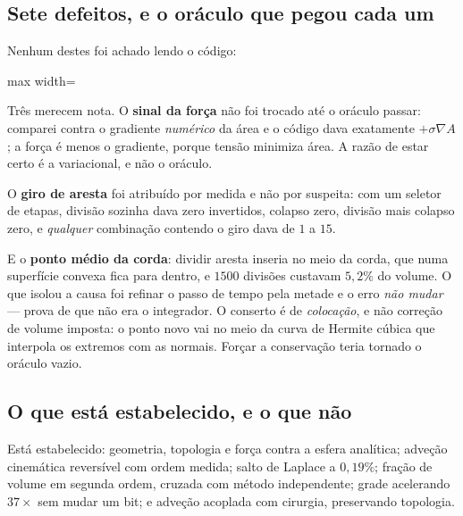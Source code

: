 \subsection{Sete defeitos, e o or\'aculo que pegou cada um}

Nenhum destes foi achado lendo o c\'odigo:

\begin{adjustbox}{max width=\linewidth}
\end{adjustbox}

Tr\^es merecem nota. O \textbf{sinal da for\c{c}a} n\~ao foi trocado at\'e o
or\'aculo passar: comparei contra o gradiente \emph{num\'erico} da \'area e o
c\'odigo dava exatamente $+\sigma\nabla A$; a for\c{c}a \'e menos o gradiente,
porque tens\~ao minimiza \'area. A raz\~ao de estar certo \'e a variacional, e
n\~ao o or\'aculo.

O \textbf{giro de aresta} foi atribu\'ido por medida e n\~ao por suspeita: com um
seletor de etapas, divis\~ao sozinha dava zero invertidos, colapso zero,
divis\~ao mais colapso zero, e \emph{qualquer} combina\c{c}\~ao contendo o giro
dava de $1$ a $15$.

E o \textbf{ponto m\'edio da corda}: dividir aresta inseria no meio da corda, que
numa superf\'icie convexa fica para dentro, e $1500$ divis\~oes custavam
$5{,}2\%$ do volume. O que isolou a causa foi refinar o passo de tempo pela
metade e o erro \emph{n\~ao mudar} --- prova de que n\~ao era o integrador. O
conserto \'e de \emph{coloca\c{c}\~ao}, e n\~ao corre\c{c}\~ao de volume imposta:
o ponto novo vai no meio da curva de Hermite c\'ubica que interpola os extremos
com as normais. For\c{c}ar a conserva\c{c}\~ao teria tornado o or\'aculo vazio.

\subsection{O que est\'a estabelecido, e o que n\~ao}

Est\'a estabelecido: geometria, topologia e for\c{c}a contra a esfera anal\'itica;
adve\c{c}\~ao cinem\'atica revers\'ivel com ordem medida; salto de Laplace a
$0{,}19\%$; fra\c{c}\~ao de volume em segunda ordem, cruzada com m\'etodo
independente; grade acelerando $37\times$ sem mudar um bit; e adve\c{c}\~ao
acoplada com cirurgia, preservando topologia.

